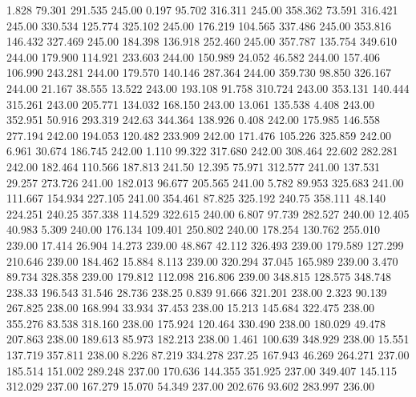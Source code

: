    1.828   79.301  291.535       245.00
   0.197   95.702  316.311       245.00
 358.362   73.591  316.421       245.00
 330.534  125.774  325.102       245.00
 176.219  104.565  337.486       245.00
 353.816  146.432  327.469       245.00
 184.398  136.918  252.460       245.00
 357.787  135.754  349.610       244.00
 179.900  114.921  233.603       244.00
 150.989   24.052   46.582       244.00
 157.406  106.990  243.281       244.00
 179.570  140.146  287.364       244.00
 359.730   98.850  326.167       244.00
  21.167   38.555   13.522       243.00
 193.108   91.758  310.724       243.00
 353.131  140.444  315.261       243.00
 205.771  134.032  168.150       243.00
  13.061  135.538    4.408       243.00
 352.951   50.916  293.319       242.63
 344.364  138.926    0.408       242.00
 175.985  146.558  277.194       242.00
 194.053  120.482  233.909       242.00
 171.476  105.226  325.859       242.00
   6.961   30.674  186.745       242.00
   1.110   99.322  317.680       242.00
 308.464   22.602  282.281       242.00
 182.464  110.566  187.813       241.50
  12.395   75.971  312.577       241.00
 137.531   29.257  273.726       241.00
 182.013   96.677  205.565       241.00
   5.782   89.953  325.683       241.00
 111.667  154.934  227.105       241.00
 354.461   87.825  325.192       240.75
 358.111   48.140  224.251       240.25
 357.338  114.529  322.615       240.00
   6.807   97.739  282.527       240.00
  12.405   40.983    5.309       240.00
 176.134  109.401  250.802       240.00
 178.254  130.762  255.010       239.00
  17.414   26.904   14.273       239.00
  48.867   42.112  326.493       239.00
 179.589  127.299  210.646       239.00
 184.462   15.884    8.113       239.00
 320.294   37.045  165.989       239.00
   3.470   89.734  328.358       239.00
 179.812  112.098  216.806       239.00
 348.815  128.575  348.748       238.33
 196.543   31.546   28.736       238.25
   0.839   91.666  321.201       238.00
   2.323   90.139  267.825       238.00
 168.994   33.934   37.453       238.00
  15.213  145.684  322.475       238.00
 355.276   83.538  318.160       238.00
 175.924  120.464  330.490       238.00
 180.029   49.478  207.863       238.00
 189.613   85.973  182.213       238.00
   1.461  100.639  348.929       238.00
  15.551  137.719  357.811       238.00
   8.226   87.219  334.278       237.25
 167.943   46.269  264.271       237.00
 185.514  151.002  289.248       237.00
 170.636  144.355  351.925       237.00
 349.407  145.115  312.029       237.00
 167.279   15.070   54.349       237.00
 202.676   93.602  283.997       236.00
